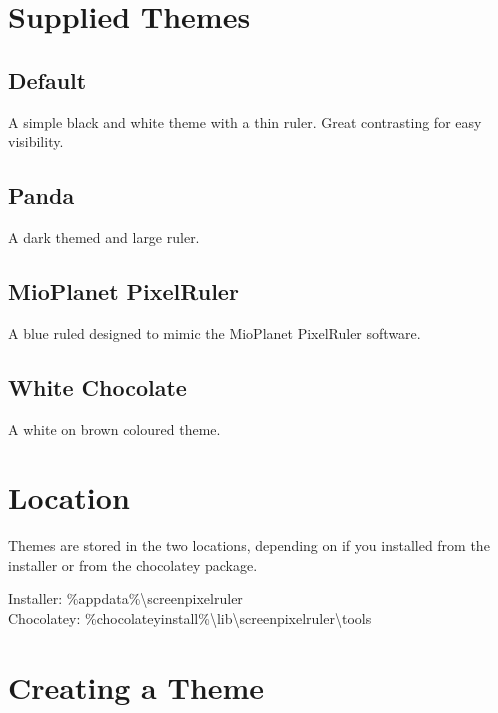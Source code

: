 \documentclass[
]{book}
\begin{document}
\hypertarget{supplied-themes}{%
\section{Supplied Themes}\label{supplied-themes}}

\hypertarget{default}{%
\subsection{Default}\label{default}}

A simple black and white theme with a thin ruler. Great contrasting for easy visibility.

\hypertarget{panda}{%
\subsection{Panda}\label{panda}}

A dark themed and large ruler.

\hypertarget{mioplanet-pixelruler}{%
\subsection{MioPlanet PixelRuler}\label{mioplanet-pixelruler}}

A blue ruled designed to mimic the MioPlanet PixelRuler software.

\hypertarget{white-chocolate}{%
\subsection{White Chocolate}\label{white-chocolate}}

A white on brown coloured theme.

\hypertarget{location-1}{%
\section{Location}\label{location-1}}

Themes are stored in the two locations, depending on if you installed from the installer or from the chocolatey package.

Installer: \%appdata\%\textbackslash screenpixelruler\\
Chocolatey: \%chocolateyinstall\%\textbackslash lib\textbackslash screenpixelruler\textbackslash tools

\hypertarget{creating-a-theme}{%
\section{Creating a Theme}\label{creating-a-theme}}
\end{document}
